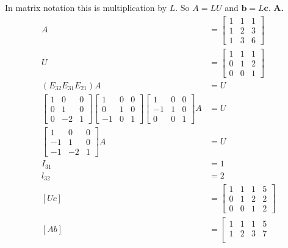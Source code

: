 \documentclass[main.tex]{subfiles}
\begin{document}
\begin{enumerate}
    In matrix notation this is multiplication by $L$. So $A=L U$ and $\bm{b}=L \bm{c}$. 
    \textbf{A.}
    $$
    \begin{aligned}
    A &= \left[\begin{array}{lll}
    1 & 1 & 1 \\
    1 & 2 & 3 \\
    1 & 3 & 6
    \end{array}\right] \\
    U &= \left[\begin{array}{lll}
    1 & 1 & 1 \\
    0 & 1 & 2 \\
    0 & 0 & 1
    \end{array}\right]\\
    \left(E_{32} E_{31} E_{21}\right) A &= U\\
    \left[\begin{array}{ccc}
    1 & 0 & 0 \\
    0 & 1 & 0 \\
    0 & -2 & 1
    \end{array}\right]\left[\begin{array}{ccc}
    1 & 0 & 0 \\
    0 & 1 & 0 \\
    -1 & 0 & 1
    \end{array}\right]\left[\begin{array}{ccc}
    1 & 0 & 0 \\
    -1 & 1 & 0 \\
    0 & 0 & 1
    \end{array}\right] A &= U\\
    \left[\begin{array}{ccc}
    1 & 0 & 0 \\
    -1 & 1 & 0 \\
    -1 & -2 & 1
    \end{array}\right] A &= U\\
    I_{31} &= 1\\
    l_{32} &= 2\\
    [U c] &=\left[\begin{array}{llll}
    1 & 1 & 1 & 5 \\
    0 & 1 & 2 & 2 \\
    0 & 0 & 1 & 2
    \end{array}\right] \\
    [A b] &= \left[\begin{array}{llll}
    1 & 1 & 1 & 5 \\
    1 & 2 & 3 & 7 \\

\end{array}
\end{aligned}$$
\end{enumerate}
\end{document}
